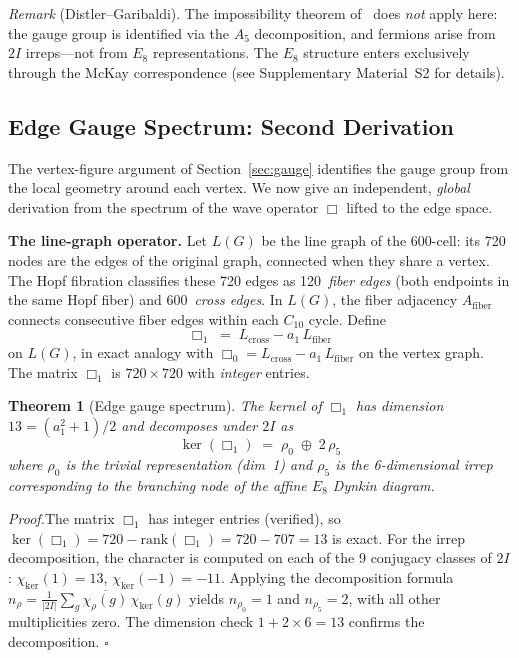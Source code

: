 \documentclass[12pt,a4paper]{article}
\newtheorem{theorem}{Theorem}
\theoremstyle{definition}
\begin{document}
\noindent\textit{Remark} (Distler--Garibaldi).  The impossibility theorem of~\cite{distler2010} does \emph{not} apply here: the gauge group is identified via the $A_5$ decomposition, and fermions arise from $2I$ irreps---not from $E_8$ representations.  The $E_8$ structure enters exclusively through the McKay correspondence (see Supplementary Material~S2 for details).


\subsection{Edge Gauge Spectrum: Second Derivation}
\label{sec:edge_gauge}

The vertex-figure argument of Section~\ref{sec:gauge} identifies the gauge group from the local geometry around each vertex.  We now give an independent, \emph{global} derivation from the spectrum of the wave operator $\Box$ lifted to the edge space.

\textbf{The line-graph operator.}  Let $L(G)$ be the line graph of the 600-cell: its 720 nodes are the edges of the original graph, connected when they share a vertex.  The Hopf fibration classifies these 720 edges as 120~\emph{fiber edges} (both endpoints in the same Hopf fiber) and 600~\emph{cross edges}.  In $L(G)$, the fiber adjacency $A_{\text{fiber}}$ connects consecutive fiber edges within each $C_{10}$ cycle.  Define
\begin{equation}
\Box_1 \;=\; L_{\text{cross}} - a_1\, L_{\text{fiber}}
\label{eq:box1_def}
\end{equation}
on $L(G)$, in exact analogy with $\Box_0 = L_{\text{cross}} - a_1\, L_{\text{fiber}}$ on the vertex graph.  The matrix $\Box_1$ is $720 \times 720$ with \emph{integer} entries.

\begin{theorem}[Edge gauge spectrum]\label{thm:edge_gauge}
The kernel of $\Box_1$ has dimension $13 = (a_1^2 + 1)/2$ and decomposes under $2I$ as
\begin{equation}
\ker(\Box_1) \;=\; \rho_0 \;\oplus\; 2\,\rho_5
\label{eq:ker_box1}
\end{equation}
where $\rho_0$ is the trivial representation (dim~1) and $\rho_5$ is the 6-dimensional irrep corresponding to the branching node of the affine $E_8$ Dynkin diagram.
\end{theorem}

\noindent\textit{Proof.}\enspace The matrix $\Box_1$ has integer entries (verified), so $\ker(\Box_1) = 720 - \mathrm{rank}(\Box_1) = 720 - 707 = 13$ is exact.  For the irrep decomposition, the character is computed on each of the 9 conjugacy classes of $2I$: $\chi_{\ker}(1) = 13$, $\chi_{\ker}(-1) = -11$.  Applying the decomposition formula $n_\rho = \tfrac{1}{|2I|}\sum_g \overline{\chi_\rho(g)}\,\chi_{\ker}(g)$ yields $n_{\rho_0} = 1$ and $n_{\rho_5} = 2$, with all other multiplicities zero.  The dimension check $1 + 2 \times 6 = 13$ confirms the decomposition.  \hfill$\square$
\end{document}
